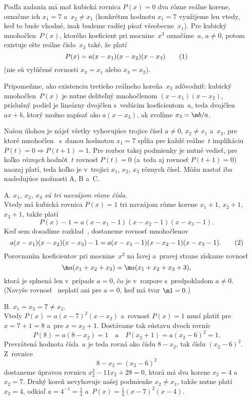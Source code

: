 {%
Podľa zadania má mať kubická rovnica $P(x)=0$ dva rôzne reálne korene,
označme ich $x_1=7$ a~$x_2\ne x_1$ (konkrétnu hodnotu $x_1=7$
využijeme len vtedy, keď to bude vhodné, inak budeme radšej písať
všeobecne~$x_1$). Pre kubický mnohočlen~$P(x)$, ktorého koeficient 
pri mocnine~$x^3$ označíme~$a$, $a\ne0$, potom existuje ešte reálne
číslo~$x_3$ také, že platí
$$
P(x)=a(x-x_1)(x-x_2)(x-x_3)                   \tag1
$$
(nie sú vylúčené rovnosti $x_3=x_1$ alebo $x_3=x_2$).

Pripomeňme, ako existenciu tretieho reálneho koreňa~$x_3$
zdôvodniť: kubický mnohočlen~$P(x)$ je nutne deliteľný
mnohočlenom $(x-x_1)(x-x_2)$, príslušný podiel je lineárny
dvojčlen s~vedúcim koeficientom~$a$, teda dvojčlen $ax+b$,
ktorý možno zapísať ako $a(x-x_3)$, ak zvolíme $x_3={\m b/a}$.

Našou úlohou je nájsť všetky vyhovujúce trojice čísel $a\ne0$,
$x_2\ne x_1$ a~$x_3$, pre ktoré mnohočlen~ s~danou hodnotou
$x_1=7$ spĺňa pre každé reálne~$t$ implikáciu
$P(t)=0\Longrightarrow P(t+1)=1$. Pre rozbor takej podmienky je
nutné vedieť, pre koľko {\it rôznych\/} hodnôt~$t$ rovnosť
$P(t)=0$ (a~teda aj rovnosť $P(t+1)=0$) naozaj platí, teda koľko
je v~trojici $x_1$, $x_2$, $x_3$ rôznych čísel. Môžu
nastať iba nasledujúce možnosti A, B a~C.

\item{A.} {\it $x_1$, $x_2$, $x_3$ sú tri navzájom rôzne čísla}.
\\
Vtedy má kubická rovnica $P(x)=1$ tri navzájom rôzne korene
$x_1+1$, $x_2+1$, $x_3+1$, takže platí
$$
P(x)-1=a(x-x_1-1)(x-x_2-1)(x-x_3-1).
$$
Keď sem dosadíme rozklad~, dostaneme rovnosť mnohočlenov
$$
a(x-x_1)(x-x_2)(x-x_3)-1=a(x-x_1-1)(x-x_2-1)(x-x_3-1).   \tag2
$$
Porovnaním koeficientov pri mocnine~$x^2$ na ľavej a~pravej strane
získame rovnosť
$$
\m a(x_1+x_2+x_3)=\m a(x_1+x_2+x_3+3),
$$
ktorá je splnená len v~prípade $a=0$, čo je v~rozpore s~predpokladom
$a\ne0$. (Navyše rovnosť~ neplatí ani pre $a=0$, keď má tvar
${\m1}=0$.)

\item{B.} $x_1=x_3=7\ne x_2$.
\\
Vtedy $P(x)=a(x-7)^2(x-x_2)$ 
a~rovnosť $P(x)=1$ musí platiť pre $x=7+1=8$ a~pre $x=x_2+1$.
Dostávame tak sústavu dvoch rovníc
$$
P(8)=a(8-x_2)=1\quad\text{a}\quad P(x_2+1)=a(x_2-6)^2=1.
$$
Prevrátená hodnota čísla~$a$ je teda rovná ako číslu $8-x_2$, tak
číslu $(x_2-6)^2$. Z~rovnice
$$
8-x_2=(x_2-6)^2
$$
dostaneme úpravou rovnicu $x_2^2-11x_2+28=0$, ktorá má dva korene
$x_2=4$ a~$x_2=7$. Druhý koreň nevyhovuje našej podmienke $x_2\ne
x_1$, takže nutne platí $x_2=4$, odkiaľ $a=4^{-1}=\frac14$ 
a~$P(x)=\frac14(x-7)^2(x-4)$.

}
